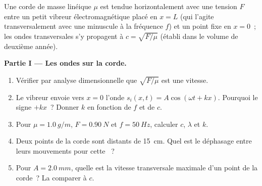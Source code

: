 \begin{problem}
\label{pb:b1:wave-propagation:1}
Une corde de masse linéique $\mu$ est tendue horizontalement avec une
tension $F$ entre un petit vibreur électromagnétique placé en $x = L$
(qui l'agite transversalement avec une  minuscule à la
fréquence $f$) et un point fixe en $x = 0$~; les ondes transversales
s'y propagent à $c = \sqrt{F/\mu}$ (établi dans le volume de deuxième année).

\medskip
\noindent\textbf{Partie I --- Les ondes sur la corde.}
\begin{enumerate}
  \item Vérifier par analyse dimensionnelle que $\sqrt{F/\mu}$ est une
        vitesse.
  \item Le vibreur envoie vers $x = 0$ l'onde
        $s_i(x, t) = A\cos(\omega t + kx)$. Pourquoi le signe $+kx$~?
        Donner $k$ en fonction de $f$ et de $c$.
  \item Pour $\mu = \qty{1.0}{g/m}$, $F = \qty{0.90}{N}$ et
        $f = \qty{50}{Hz}$, calculer $c$, $\lambda$ et $k$.
  \item Deux points de la corde sont distants de \qty{15}{cm}. Quel est
        le déphasage entre leurs mouvements pour cette ~?
  \item Pour $A = \qty{2.0}{mm}$, quelle est la vitesse transversale
        maximale d'un point de la corde~? La comparer à $c$.
\end{enumerate}


\end{problem}
